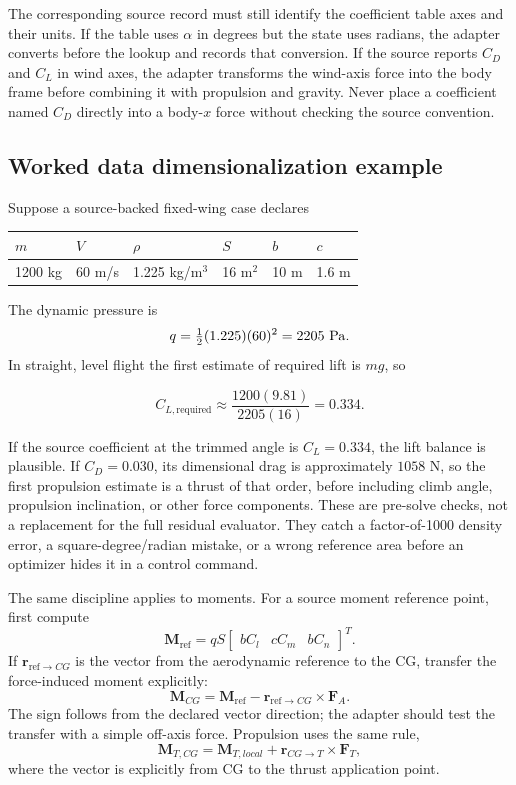 \documentclass[11pt]{article}
\begin{document}
The corresponding source record must still identify the coefficient table axes
and their units. If the table uses $\alpha$ in degrees but the state uses
radians, the adapter converts before the lookup and records that conversion.
If the source reports $C_D$ and $C_L$ in wind axes, the adapter transforms the
wind-axis force into the body frame before combining it with propulsion and
gravity. Never place a coefficient named $C_D$ directly into a body-$x$ force
without checking the source convention.

\subsection{Worked data dimensionalization example}

Suppose a source-backed fixed-wing case declares

\begin{center}
\begin{tabular}{llllll}
\toprule
$m$ & $V$ & $\rho$ & $S$ & $b$ & $c$\\
\midrule
1200 kg & 60 m/s & 1.225 kg/m$^3$ & 16 m$^2$ & 10 m & 1.6 m\\
\bottomrule
\end{tabular}
\end{center}

The dynamic pressure is
\[
  q=\tfrac12(1.225)(60)^2=2205\ {\rm Pa}.
\]
In straight, level flight the first estimate of required lift is $mg$, so

\[
  C_{L,\mathrm{required}}
  \approx \frac{1200(9.81)}{2205(16)}=0.334.
\]

If the source coefficient at the trimmed angle is $C_L=0.334$, the lift
balance is plausible. If $C_D=0.030$, its dimensional drag is approximately
$1058$ N, so the first propulsion estimate is a thrust of that order, before
including climb angle, propulsion inclination, or other force components. These
are pre-solve checks, not a replacement for the full residual evaluator. They
catch a factor-of-1000 density error, a square-degree/radian mistake, or a
wrong reference area before an optimizer hides it in a control command.

The same discipline applies to moments. For a source moment reference point,
first compute
\[
  \boldsymbol M_{\mathrm{ref}}
  =qS\begin{bmatrix}bC_l&cC_m&bC_n\end{bmatrix}^{T}.
\]
If $\boldsymbol r_{\mathrm{ref}\to CG}$ is the vector from the aerodynamic
reference to the CG, transfer the force-induced moment explicitly:
\[
  \boldsymbol M_{CG}
  =\boldsymbol M_{\mathrm{ref}}
   -\boldsymbol r_{\mathrm{ref}\to CG}\times\boldsymbol F_{A}.
\]
The sign follows from the declared vector direction; the adapter should test
the transfer with a simple off-axis force. Propulsion uses the same rule,
\[
  \boldsymbol M_{T,CG}
  =\boldsymbol M_{T,local}
   +\boldsymbol r_{CG\to T}\times\boldsymbol F_T,
\]
where the vector is explicitly from CG to the thrust application point.
\end{document}
